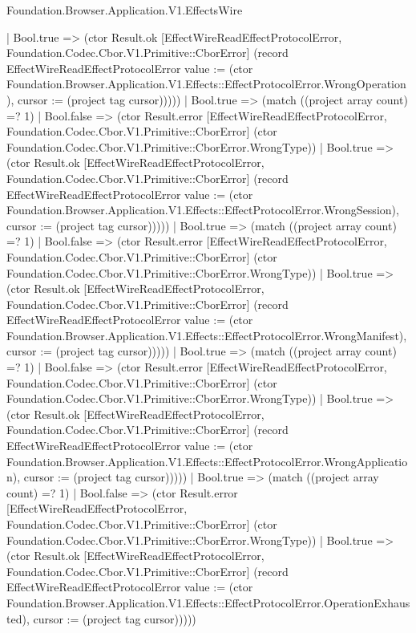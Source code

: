 \begin{lexlean}{Foundation.Browser.Application.V1.EffectsWire}
\begin{semanticmodule}
{                            | Bool.true => (ctor Result.ok [EffectWireReadEffectProtocolError, Foundation.Codec.Cbor.V1.Primitive::CborError] (record EffectWireReadEffectProtocolError {value := (ctor Foundation.Browser.Application.V1.Effects::EffectProtocolError.WrongOperation), cursor := (project tag cursor)}))))
                        | Bool.true => (match ((project array count) =? 1)
                          | Bool.false => (ctor Result.error [EffectWireReadEffectProtocolError, Foundation.Codec.Cbor.V1.Primitive::CborError] (ctor Foundation.Codec.Cbor.V1.Primitive::CborError.WrongType))
                          | Bool.true => (ctor Result.ok [EffectWireReadEffectProtocolError, Foundation.Codec.Cbor.V1.Primitive::CborError] (record EffectWireReadEffectProtocolError {value := (ctor Foundation.Browser.Application.V1.Effects::EffectProtocolError.WrongSession), cursor := (project tag cursor)}))))
                      | Bool.true => (match ((project array count) =? 1)
                        | Bool.false => (ctor Result.error [EffectWireReadEffectProtocolError, Foundation.Codec.Cbor.V1.Primitive::CborError] (ctor Foundation.Codec.Cbor.V1.Primitive::CborError.WrongType))
                        | Bool.true => (ctor Result.ok [EffectWireReadEffectProtocolError, Foundation.Codec.Cbor.V1.Primitive::CborError] (record EffectWireReadEffectProtocolError {value := (ctor Foundation.Browser.Application.V1.Effects::EffectProtocolError.WrongManifest), cursor := (project tag cursor)}))))
                    | Bool.true => (match ((project array count) =? 1)
                      | Bool.false => (ctor Result.error [EffectWireReadEffectProtocolError, Foundation.Codec.Cbor.V1.Primitive::CborError] (ctor Foundation.Codec.Cbor.V1.Primitive::CborError.WrongType))
                      | Bool.true => (ctor Result.ok [EffectWireReadEffectProtocolError, Foundation.Codec.Cbor.V1.Primitive::CborError] (record EffectWireReadEffectProtocolError {value := (ctor Foundation.Browser.Application.V1.Effects::EffectProtocolError.WrongApplication), cursor := (project tag cursor)}))))
                  | Bool.true => (match ((project array count) =? 1)
                    | Bool.false => (ctor Result.error [EffectWireReadEffectProtocolError, Foundation.Codec.Cbor.V1.Primitive::CborError] (ctor Foundation.Codec.Cbor.V1.Primitive::CborError.WrongType))
                    | Bool.true => (ctor Result.ok [EffectWireReadEffectProtocolError, Foundation.Codec.Cbor.V1.Primitive::CborError] (record EffectWireReadEffectProtocolError {value := (ctor Foundation.Browser.Application.V1.Effects::EffectProtocolError.OperationExhausted), cursor := (project tag cursor)}))))
}
\end{semanticmodule}
\end{lexlean}
